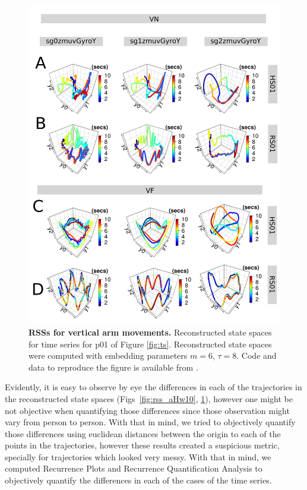 \documentclass[fleqn,10pt]{wlscirep}
\begin{document}
\begin{figure}[ht]
\centering
\includegraphics[width=1.0\textwidth]{figures/rss/pdf/fig4}
    \caption{
	{\bf RSSs for vertical arm movements.}
	Reconstructed state spaces for time series for p01 of Figure \ref{fig:ts}.
	Reconstructed state spaces were computed with 
	embedding parameters $m=6$, $\tau=8$.
	Code and data to reproduce the figure is available from \cite{srep2019}.
        }
    \label{fig:rss_aVw10}
\end{figure}

Evidently, it is easy to observe by eye the differences in each of the
trajectories in the reconstructed state spaces 
(Figs~\ref{fig:rss_aHw10}, \ref{fig:rss_aVw10}), 
however one might be not objective when quantifying those differences 
since those observation might vary from person to person.
With that in mind, we tried to objectively quantify those differences 
using euclidean distances between the origin to each of the points in the 
trajectories, however these results created a suspicious metric, specially 
for trajectories which looked very messy.
With that in mind, we computed Recurrence Plots and 
Recurrence Quantification Analysis to objectively quantify 
the differences in each of the cases of the time series.
\end{document}
